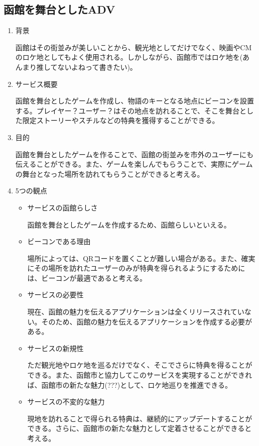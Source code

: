 \subsection{函館を舞台としたADV}
\begin{enumerate}
    \item 背景
    \par 函館はその街並みが美しいことから、観光地としてだけでなく、映画やCMのロケ地としてもよく使用される。しかしながら、函館市ではロケ地を(あんまり推してないよねって書きたい)。
    \item サービス概要
    \par 函館を舞台としたゲームを作成し、物語のキーとなる地点にビーコンを設置する。プレイヤー？ユーザー？はその地点を訪れることで、そこを舞台とした限定ストーリーやスチルなどの特典を獲得することができる。
    \item 目的
    \par 函館を舞台としたゲームを作ることで、函館の街並みを市外のユーザーにも伝えることができる。また、ゲームを楽しんでもらうことで、実際にゲームの舞台となった場所を訪れてもらうことができると考える。
    \item 5つの観点
    \begin{itemize}
        \item サービスの函館らしさ
        \par 函館を舞台としたゲームを作成するため、函館らしいといえる。
        \item ビーコンである理由
        \par 場所によっては、QRコードを置くことが難しい場合がある。また、確実にその場所を訪れたユーザーのみが特典を得られるようにするためには、ビーコンが最適であると考える。
        \item サービスの必要性
        \par 現在、函館の魅力を伝えるアプリケーションは全くリリースされていない。そのため、函館の魅力を伝えるアプリケーションを作成する必要がある。
        \item サービスの新規性
        \par ただ観光地やロケ地を巡るだけでなく、そこでさらに特典を得ることができる。また、函館市と協力してこのサービスを実現することができれば、函館市の新たな魅力(???)として、ロケ地巡りを推進できる。
        \item サービスの不変的な魅力
        \par 現地を訪れることで得られる特典は、継続的にアップデートすることができる。さらに、函館市の新たな魅力として定着させることができると考える。
    \end{itemize}
\end{enumerate}

